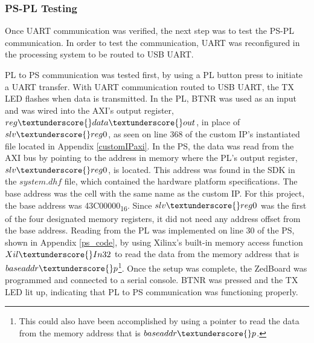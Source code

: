 \subsubsection{PS-PL Testing}
Once UART communication was verified, the next step was to test the PS-PL communication. In order to test the communication, UART was reconfigured in the processing system to be routed to USB UART.
\par
PL to PS communication was tested first, by using a PL button press to initiate a UART transfer. With UART communication routed to USB UART, the TX LED flashes when data is transmitted. In the PL, BTNR was used as an input and was wired into the AXI's output register, $reg\textunderscore{}data\textunderscore{}out$, in place of $slv\textunderscore{}reg0$, as seen on line 368 of the custom IP's instantiated file located in Appendix \ref{customIPaxi}. In the PS, the data was read from the AXI bus by pointing to the address in memory where the PL's output register, $slv\textunderscore{}reg0$, is located. This address was found in the SDK in the $system.dhf$ file, which contained the hardware platform specifications. The base address was the cell with the same name as the custom IP. For this project, the base address was 43C00000\textsubscript{16}. Since $slv\textunderscore{}reg0$ was the first of the four designated memory registers, it did not need any address offset from the base address. Reading from the PL was implemented on line 30 of the PS, shown in Appendix \ref{ps_code}, by using Xilinx's built-in memory access function $Xil\textunderscore{}In32$ to read the data from the memory address that is $baseaddr\textunderscore{}p$\footnote{This could also have been accomplished by using a pointer to read the data from the memory address that is $baseaddr\textunderscore{}p$.}. Once the setup was complete, the ZedBoard was programmed and connected to a serial console. BTNR was pressed and the TX LED lit up, indicating that PL to PS communication was functioning properly.
\par
